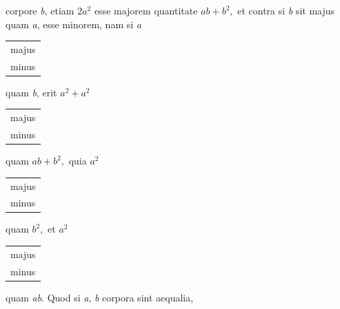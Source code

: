 \protect{}
\rule[-0mm]{0pt}{5mm}%
%
\newline%
%
corpore \textit{b},
etiam
%
%
$2a^2$ esse majorem quantitate
%
%
%
%
$ab+b^2,$
\newline%
et contra
si \textit{b} sit majus quam \textit{a},
esse minorem,
\newline%
nam si \textit{a}%
\hspace{-0,75mm}%
\begin{tabular}[t]{l}%
majus\\ minus%
\end{tabular}%
\hspace{-0,75mm}%
quam \textit{b},
erit $a^2+ a^2$%
%
%
\hspace{-0,75mm}%
\begin{tabular}[t]{l}%
majus\\ minus%
\end{tabular}%
\hspace{-0,75mm}%
quam $ab+b^2,$
\newline%
quia $a^2$%
\hspace{-0,75mm}%
\begin{tabular}[t]{l}%
majus\\ minus%
\end{tabular}%
\hspace{-0,75mm}%
quam $b^2,$
et $a^2$%
\hspace{-0,75mm}%
\begin{tabular}[t]{l}%
majus\\ minus%
\end{tabular}%
\hspace{-0,75mm}%
quam \textit{ab}.
\pend%
%
\pstart%
Quod si \textit{a}, \textit{b} corpora sint aequalia,%
\protect{}
